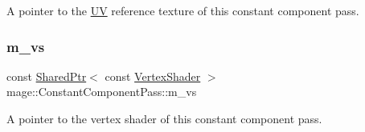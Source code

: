 A pointer to the \hyperlink{structmage_1_1_u_v}{UV} reference texture of this constant component pass. \hypertarget{classmage_1_1_constant_component_pass_aec78ab8193d28847ad591947f03f6515}{}\label{classmage_1_1_constant_component_pass_aec78ab8193d28847ad591947f03f6515} 
\subsubsection{\texorpdfstring{m\+\_\+vs}{m\_vs}}
{\footnotesize\ttfamily const \hyperlink{namespacemage_a1e01ae66713838a7a67d30e44c67703e}{Shared\+Ptr}$<$ const \hyperlink{classmage_1_1_vertex_shader}{Vertex\+Shader} $>$ mage\+::\+Constant\+Component\+Pass\+::m\+\_\+vs\hspace{0.3cm}{\ttfamily [private]}}

A pointer to the vertex shader of this constant component pass. 